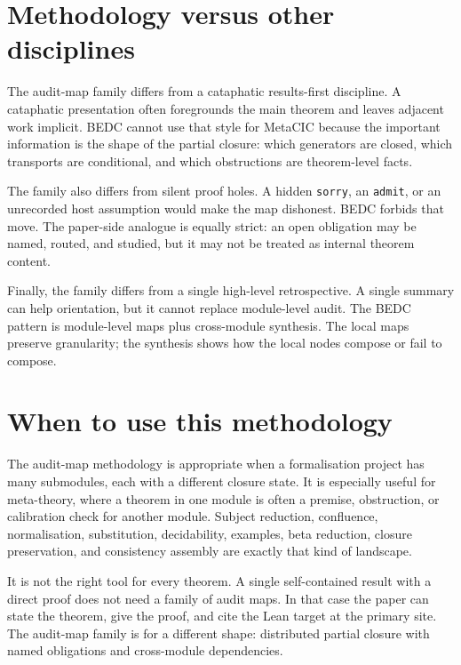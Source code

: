 \section{Methodology versus other disciplines}
\label{sec:audit-map-family-versus-other-disciplines}

The audit-map family differs from a cataphatic results-first discipline. A
cataphatic presentation often foregrounds the main theorem and leaves adjacent
work implicit. BEDC cannot use that style for MetaCIC because the important
information is the shape of the partial closure: which generators are closed,
which transports are conditional, and which obstructions are theorem-level
facts.

The family also differs from silent proof holes. A hidden \texttt{sorry}, an
\texttt{admit}, or an unrecorded host assumption would make the map dishonest.
BEDC forbids that move. The paper-side analogue is equally strict: an open
obligation may be named, routed, and studied, but it may not be treated as
internal theorem content.

Finally, the family differs from a single high-level retrospective. A single
summary can help orientation, but it cannot replace module-level audit. The
BEDC pattern is module-level maps plus cross-module synthesis. The local maps
preserve granularity; the synthesis shows how the local nodes compose or fail
to compose.

\section{When to use this methodology}
\label{sec:audit-map-family-when-to-use}

The audit-map methodology is appropriate when a formalisation project has many
submodules, each with a different closure state. It is especially useful for
meta-theory, where a theorem in one module is often a premise, obstruction, or
calibration check for another module. Subject reduction, confluence,
normalisation, substitution, decidability, examples, beta reduction, closure
preservation, and consistency assembly are exactly that kind of landscape.

It is not the right tool for every theorem. A single self-contained result with
a direct proof does not need a family of audit maps. In that case the paper can
state the theorem, give the proof, and cite the Lean target at the primary
site. The audit-map family is for a different shape: distributed partial
closure with named obligations and cross-module dependencies.

